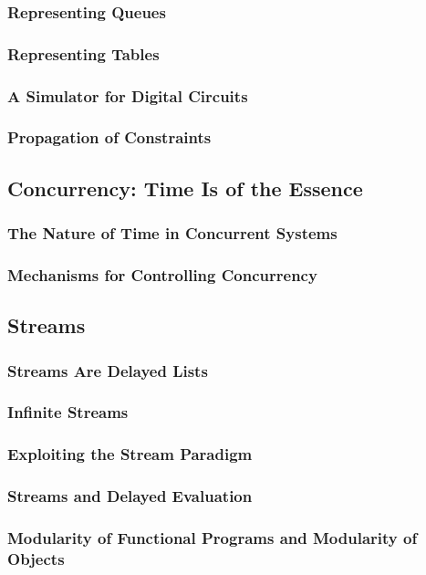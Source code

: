             \subsubsection{Representing Queues}
            \subsubsection{Representing Tables}
            \subsubsection{A Simulator for Digital Circuits}
            \subsubsection{Propagation of Constraints}
        \subsection{Concurrency: Time Is of the Essence}
            \subsubsection{The Nature of Time in Concurrent Systems}
            \subsubsection{Mechanisms for Controlling Concurrency}
        \subsection{Streams}
            \subsubsection{Streams Are Delayed Lists}
            \subsubsection{Infinite Streams}
            \subsubsection{Exploiting the Stream Paradigm}
            \subsubsection{Streams and Delayed Evaluation}
            \subsubsection{Modularity of Functional Programs and Modularity of Objects}

